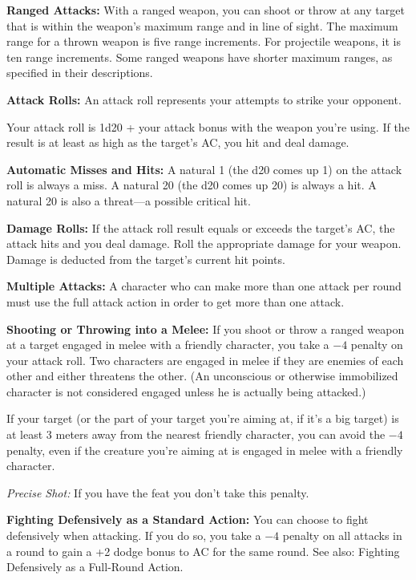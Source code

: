 \textbf{Ranged Attacks:} With a ranged weapon, you can shoot or throw at any target that is within the weapon's maximum range and in line of sight. The maximum range for a thrown weapon is five range increments. For projectile weapons, it is ten range increments. Some ranged weapons have shorter maximum ranges, as specified in their descriptions.

\textbf{Attack Rolls:} An attack roll represents your attempts to strike your opponent.

Your attack roll is 1d20 + your attack bonus with the weapon you're using. If the result is at least as high as the target's AC, you hit and deal damage.

\textbf{Automatic Misses and Hits:} A natural 1 (the d20 comes up 1) on the attack roll is always a miss. A natural 20 (the d20 comes up 20) is always a hit. A natural 20 is also a threat---a possible critical hit.

\textbf{Damage Rolls:} If the attack roll result equals or exceeds the target's AC, the attack hits and you deal damage. Roll the appropriate damage for your weapon. Damage is deducted from the target's current hit points.

\textbf{Multiple Attacks:} A character who can make more than one attack per round must use the full attack action in order to get more than one attack.

\textbf{Shooting or Throwing into a Melee:} If you shoot or throw a ranged weapon at a target engaged in melee with a friendly character, you take a $-4$ penalty on your attack roll. Two characters are engaged in melee if they are enemies of each other and either threatens the other. (An unconscious or otherwise immobilized character is not considered engaged unless he is actually being attacked.)

If your target (or the part of your target you're aiming at, if it's a big target) is at least 3 meters away from the nearest friendly character, you can avoid the $-4$ penalty, even if the creature you're aiming at is engaged in melee with a friendly character.

\textit{Precise Shot:} If you have the  feat you don't take this penalty.

\textbf{Fighting Defensively as a Standard Action:} You can choose to fight defensively when attacking. If you do so, you take a $-4$ penalty on all attacks in a round to gain a +2 dodge bonus to AC for the same round. See also: Fighting Defensively as a Full-Round Action.

